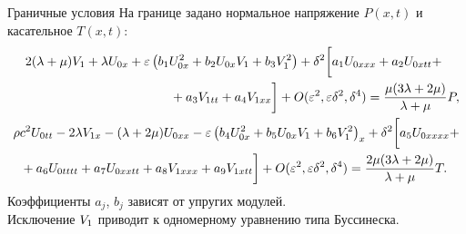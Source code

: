\documentclass[usenames,dvipsnames]{beamer}
\newcommand{\lb}{\left (}
\newcommand{\rb}{\right )}
\begin{document}
\begin{frame}{Граничные условия}
На границе задано нормальное напряжение $P(x,t)$ и касательное $T(x,t)$:
\small
\begin{align*} \nonumber
\begin{split}
&2 (\lambda + \mu) {\color{black}V_1} + \lambda {\color{black}U_{0x}} +\varepsilon \lb b_1 {\color{black}U_{0x}^2} + b_2 {\color{black}U_{0x}}{\color{black}V_1} + b_3 {\color{black}V_1^2} \rb + \delta^2 \bigg[ a_1 {\color{black}U_{0xxx}} + a_2 {\color{black}U_{0xtt}} +\\
&\hspace{40mm}+ a_3 {\color{black}V_{1tt}} + a_4 {\color{black}V_{1xx}}\bigg] + O(\varepsilon^2, \varepsilon\delta^2, \delta^4) =  \frac{\mu(3\lambda + 2\mu)}{\lambda + \mu} P,
\end{split}\\
\begin{split}
&\rho  c^2 {\color{black}U_{0tt}} -2 \lambda {\color{black}V_{1x}}-(\lambda +2 \mu ) {\color{black}U_{0xx}} - \varepsilon \lb b_4 {\color{black}U_{0x}^2} + b_5 {\color{black}U_{0x}}{\color{black}V_1} + b_6 {\color{black}V_1^2} \rb_x + \delta^2\bigg[a_5 {\color{black}U_{0xxxx}} +\\
&\hspace{2mm}+ a_6 {\color{black}U_{0tttt}} + a_7 {\color{black}U_{0xxtt}} + a_8 {\color{black}V_{1xxx}} + a_9 {\color{black}V_{1xtt}} \bigg] + O(\varepsilon^2, \varepsilon\delta^2, \delta^4) = \frac{2\mu(3\lambda + 2\mu)}{\lambda + \mu} T.
\end{split}
\end{align*}
Коэффициенты $a_j$, $b_j$ зависят от упругих модулей.\\
\vspace{1mm}
\normalsize
Исключение ${\color{black}V_1}$ приводит к одномерному уравнению типа Буссинеска.
\end{frame}


%
\end{document}
